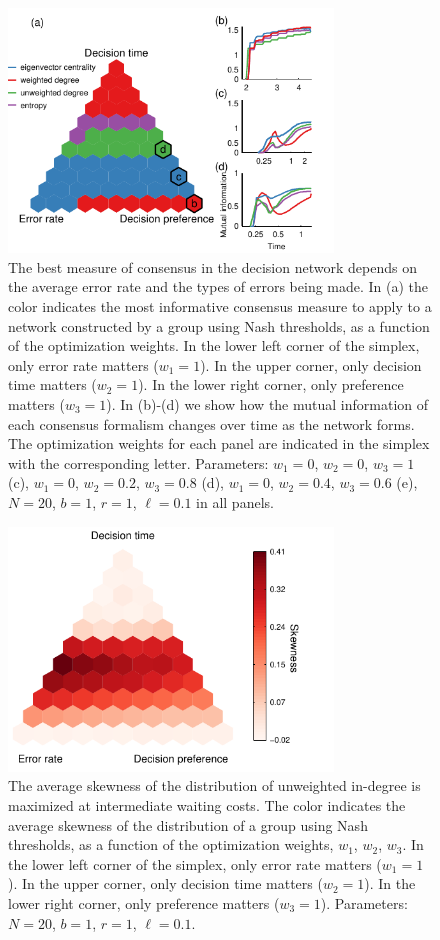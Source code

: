 \documentclass{pnastwo}
\begin{document}
\begin{figure}[htp]
\includegraphics[width=3.4in]{Figure3.pdf}
\caption{\label{bestmetric} The best measure of consensus in the decision network depends on the average error rate and the types of errors being made. In (a) the color indicates the most informative consensus measure to apply to a network constructed by a group using Nash thresholds, as a function of the optimization weights. In the lower left corner of the simplex, only error rate matters ($w_1=1$).  In the upper corner, only decision time matters ($w_2=1$).  In the lower right corner, only preference matters ($w_3=1$). In (b)-(d) we show how the mutual information of each consensus formalism changes over time as the network forms. The optimization weights for each panel are indicated in the simplex with the corresponding letter. Parameters: $w_1=0$, $w_2=0$, $w_3=1$ (c), $w_1=0$, $w_2=0.2$, $w_3=0.8$ (d), $w_1=0$, $w_2=0.4$, $w_3=0.6$ (e),  $N=20$, $b=1$, $r=1$, $\ell=0.1$ in all panels.}
\end{figure}


\begin{figure}[htp]
\includegraphics[width=3.4in]{Figure4}
\caption{\label{skewness} The average skewness of the distribution of unweighted in-degree is maximized at intermediate waiting costs. The color indicates the average skewness of the distribution of a group using Nash thresholds, as a function of the optimization weights, $w_1$, $w_2$, $w_3$. In the lower left corner of the simplex, only error rate matters ($w_1=1$).  In the upper corner, only decision time matters ($w_2=1$).  In the lower right corner, only preference matters ($w_3=1$). Parameters: $N=20$, $b=1$, $r=1$, $\ell=0.1$.}
\end{figure}
\end{document}
